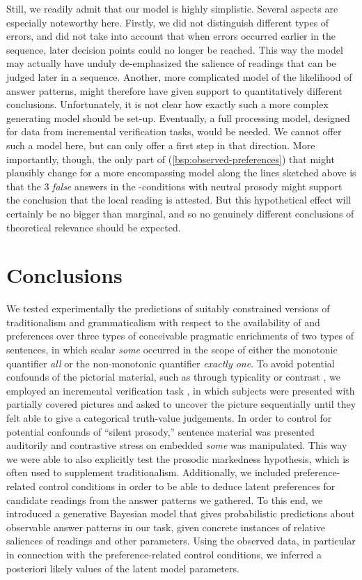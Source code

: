 \documentclass[fleqn,reqno,10pt]{article}
\newcommand{\as}{\acro{as}}
\begin{document}
Still, we readily admit that our model is highly simplistic. Several
aspects are especially noteworthy here. Firstly, we did not
distinguish different types of errors, and did not take into account
that when errors occurred earlier in the sequence, later decision
points could no longer be reached. This way the model may actually
have unduly de-emphasized the salience of readings that can be judged
later in a sequence. Another, more complicated model of the likelihood
of answer patterns, might therefore have given support to
quantitatively different conclusions. Unfortunately, it is not clear
how exactly such a more complex generating model should be
set-up. Eventually, a full processing model, designed for data from
incremental verification tasks, would be needed. We cannot offer such
a model here, but can only offer a first step in that
direction. More importantly, though, the only part of
(\ref{bsp:observed-preferences}) that might plausibly change for a
more encompassing model along the lines sketched above is that the 3
\emph{false} answers in the \as-conditions with neutral prosody
might support the conclusion that the local reading is attested. But
this hypothetical effect will certainly be no bigger than marginal,
and so no genuinely different conclusions of theoretical relevance
should be expected.

\section{Conclusions}
\label{sec:conclusions}

We tested experimentally the predictions of suitably constrained
versions of traditionalism and grammaticalism with respect to the
availability of and preferences over three types of conceivable
pragmatic enrichments of two types of sentences, in which scalar
\emph{some} occurred in the scope of either the monotonic quantifier
\emph{all} or the non-monotonic quantifier \emph{exactly one}. To
avoid potential confounds of the pictorial material, such as through
typicality or contrast
\citep{Tielvan-Tiel2012:Embedded-Scalar,GeurtsTielvan-Tiel2013:Embedded-Scalar},
we employed an incremental verification task \citep{Conroy2008}, in
which subjects were presented with partially covered pictures and
asked to uncover the picture sequentially until they felt able to give
a categorical truth-value judgements. In order to control for
potential confounds of ``silent prosody,'' sentence material was
presented auditorily and contrastive stress on embedded \emph{some}
was manipulated. This way we were able to also explicitly test the
prosodic markedness hypothesis, which is often used to supplement
traditionalism. Additionally, we included preference-related control
conditions in order to be able to deduce latent preferences for
candidate readings from the answer patterns we gathered. To this end,
we introduced a generative Bayesian model that gives probabilistic
predictions about observable answer patterns in our task, given
concrete instances of relative saliences of readings and other
parameters. Using the observed data, in particular in connection with
the preference-related control conditions, we inferred a posteriori
likely values of the latent model parameters.
\end{document}
